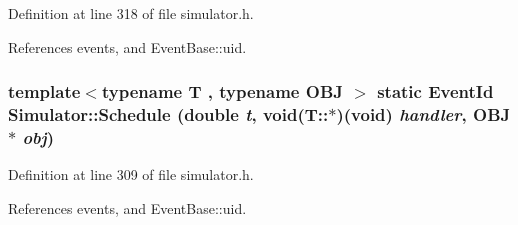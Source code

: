 Definition at line 318 of file simulator.h.

References events, and EventBase::uid.
\subsubsection[{Schedule}]{\setlength{\rightskip}{0pt plus 5cm}template$<$typename T , typename OBJ $>$ static {\bf EventId} Simulator::Schedule (double {\em t}, \/  void(T::$\ast$)(void) {\em handler}, \/  OBJ $\ast$ {\em obj})\hspace{0.3cm}{\tt  [inline, static]}}\label{classSimulator_2b4be0a76ed9915d4c1c861386d666bc}




Definition at line 309 of file simulator.h.

References events, and EventBase::uid.

